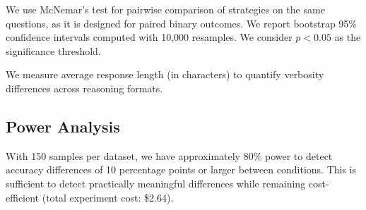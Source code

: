  We use McNemar's test for pairwise comparison of strategies on the same questions, as it is designed for paired binary outcomes. We report bootstrap 95\% confidence intervals computed with 10,000 resamples. We consider $p < 0.05$ as the significance threshold.

 We measure average response length (in characters) to quantify verbosity differences across reasoning formats.

\subsection{Power Analysis}
\label{sec:power}

With 150 samples per dataset, we have approximately 80\% power to detect accuracy differences of 10 percentage points or larger between conditions. This is sufficient to detect practically meaningful differences while remaining cost-efficient (total experiment cost: \$2.64).
